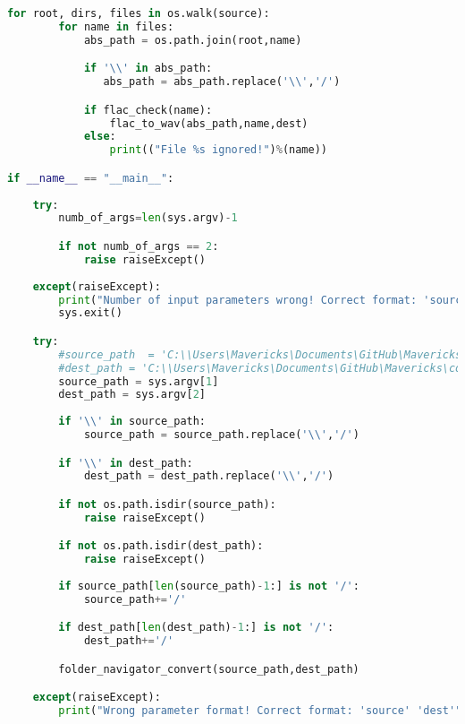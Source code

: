 \begin{lstlisting}[language=Python, caption=FlacToWavPy code.]
    for root, dirs, files in os.walk(source):
        for name in files:
            abs_path = os.path.join(root,name)

            if '\\' in abs_path:
               abs_path = abs_path.replace('\\','/')

            if flac_check(name):
                flac_to_wav(abs_path,name,dest)
            else:
                print(("File %s ignored!")%(name))

if __name__ == "__main__":
    
    try: 
        numb_of_args=len(sys.argv)-1

        if not numb_of_args == 2: 
            raise raiseExcept()
            
    except(raiseExcept):
        print("Number of input parameters wrong! Correct format: 'source' 'dest'")
        sys.exit()

    try: 
        #source_path  = 'C:\\Users\Mavericks\Documents\GitHub\Mavericks\coding\PyTests\FolderNavTest\Testing_folder'             //these two could be used instead of sys.argv[1] and sys.argv[2]
        #dest_path = 'C:\\Users\Mavericks\Documents\GitHub\Mavericks\coding\PyTests\FolderNavTest\Results_folder'                // in order to run the code in an IDE or similar 
        source_path = sys.argv[1]
        dest_path = sys.argv[2]
        
        if '\\' in source_path:
            source_path = source_path.replace('\\','/')

        if '\\' in dest_path:
            dest_path = dest_path.replace('\\','/')

        if not os.path.isdir(source_path):
            raise raiseExcept()

        if not os.path.isdir(dest_path):
            raise raiseExcept()
        
        if source_path[len(source_path)-1:] is not '/':
            source_path+='/'

        if dest_path[len(dest_path)-1:] is not '/':
            dest_path+='/'

        folder_navigator_convert(source_path,dest_path)

    except(raiseExcept): 
        print("Wrong parameter format! Correct format: 'source' 'dest'")
\end{lstlisting}

